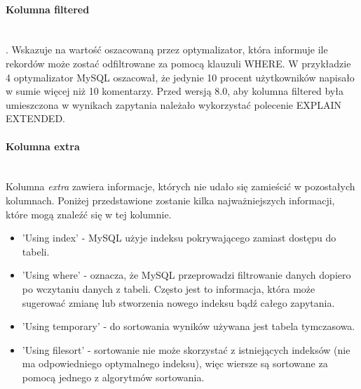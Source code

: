 \paragraph{Kolumna filtered}\leavevmode\\. Wskazuje na wartość oszacowaną przez optymalizator, która informuje ile rekordów może zostać odfiltrowane za pomocą klauzuli WHERE. W przykładzie 4 optymalizator MySQL oszacował, że jedynie 10 procent użytkowników napisało w sumie więcej niż 10 komentarzy. Przed wersją 8.0, aby kolumna filtered była umieszczona w wynikach zapytania należało wykorzystać polecenie EXPLAIN EXTENDED.

\paragraph{Kolumna extra}\leavevmode\\
Kolumna \textit{extra} zawiera informacje, których nie udało się zamieścić w pozostałych kolumnach. Poniżej przedstawione zostanie kilka najważniejszych informacji, które mogą znaleźć się w tej kolumnie.

\begin{itemize}
	\item 'Using index' - MySQL użyje indeksu pokrywającego zamiast dostępu do tabeli.
	\item 'Using where' - oznacza, że MySQL przeprowadzi filtrowanie danych dopiero po wczytaniu danych z tabeli. Często jest to informacja, która może sugerować zmianę lub stworzenia nowego indeksu bądź całego zapytania.
	\item 'Using temporary' - do sortowania wyników używana jest tabela tymczasowa.
	\item 'Using filesort' - sortowanie nie może skorzystać z istniejących indeksów (nie ma odpowiedniego optymalnego indeksu), więc wiersze są sortowane za pomocą jednego z algorytmów sortowania.
	
\end{itemize}
